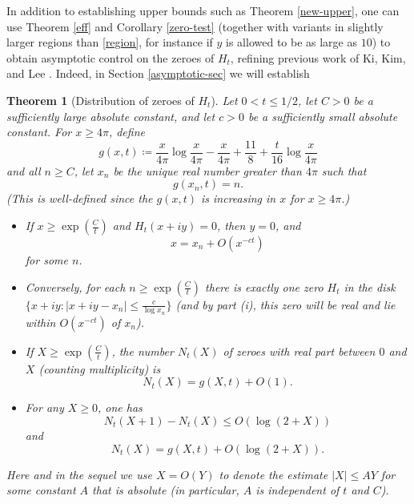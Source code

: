 \documentclass[a4paper,11pt,twoside]{amsart}
\newtheorem{theorem}{Theorem}[section]
\begin{document}
In addition to establishing upper bounds such as Theorem \ref{new-upper}, one can use Theorem \ref{eff} and Corollary \ref{zero-test} (together with variants in slightly larger regions than \eqref{region}, for instance if $y$ is allowed to be as large as $10$) to obtain asymptotic control on the zeroes of $H_t$, refining previous work of Ki, Kim, and Lee \cite{kkl}.  Indeed, in Section \ref{asymptotic-sec} we will establish

\begin{theorem}[Distribution of zeroes of $H_t$]\label{Zero}  Let $0 < t \leq 1/2$, let $C>0$ be a sufficiently large absolute constant, and let $c>0$ be a sufficiently small absolute constant.  For $x \geq 4\pi$, define
$$ g(x,t) \coloneqq  \frac{x}{4\pi} \log \frac{x}{4\pi} - \frac{x}{4\pi} + \frac{11}{8} + \frac{t}{16} \log \frac{x}{4\pi} $$
and all $n \geq C$, let $x_n$ be the unique real number greater than $4\pi$ such that
\begin{equation}\label{lip}
 g(x_n,t) = n.
\end{equation}
(This is well-defined since the $g(x,t)$ is increasing in $x$ for $x \geq 4\pi$.)
\begin{itemize}
\item[(i)]  If $x \geq \exp(\frac{C}{t})$ and $H_t(x+iy)=0$, then $y=0$, and
$$ x = x_n + O(x^{-ct})$$
for some $n$.  
\item[(ii)]  Conversely, for each $n \geq \exp( \frac{C}{t} )$ there is exactly one zero $H_t$ in the disk $\{ x+iy: |x+iy - x_n| \leq \frac{c}{\log x_n} \}$ (and by part (i), this zero will be real and lie within $O(x^{-ct})$ of $x_n$).
\item[(iii)]  If $X \geq \exp(\frac{C}{t})$, the number $N_t(X)$ of zeroes with real part between $0$ and $X$ (counting multiplicity) is
$$ N_t(X) = g(X,t) + O(1).$$
\item[(iv)]  For any $X \geq 0$, one has
$$ N_t(X+1) - N_t(X) \leq O( \log(2+X) )$$
and
$$ N_t(X) = g(X,t) + O( \log(2+X) ).$$
\end{itemize}
Here and in the sequel we use $X = O(Y)$ to denote the estimate $|X| \leq AY$ for some constant $A$ that is absolute (in particular, $A$ is independent of $t$ and $C$).
\end{theorem}
\end{document}
